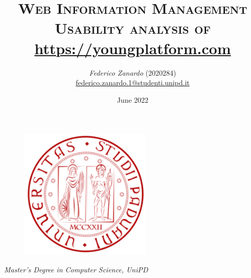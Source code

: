 \documentclass[12pt]{article}
\title{ \huge\textsc{Web Information Management} \\
		\large\textsc{Usability analysis of } \href{https://youngplatform.com}{https://youngplatform.com}}
\author{\textit{Federico Zanardo} (2020284) \\
\small \href{mailto:federico.zanardo.1@studenti.unipd.it}{federico.zanardo.1@studenti.unipd.it}}
\date{\small June 2022}
\renewcommand{\baselinestretch}{1.075}
\newcommand{\hr}{\par\vspace{-.1\ht\strutbox}\noindent\hrulefill\par}
\begin{document}
 

\begin{figure}[t!]
    \centering
    \includegraphics[height=17em]{res/images/logo.png}
\end{figure}

\maketitle 
\thispagestyle{empty}

\begin{center}
    \vspace{12em}
    \hr
    \textit{Master's Degree in Computer Science, UniPD}
\end{center}

\newpage
\renewcommand{\baselinestretch}{0.95}\normalsize
\tableofcontents
\renewcommand{\baselinestretch}{1.075}\normalsize

\newpage

\end{document}
